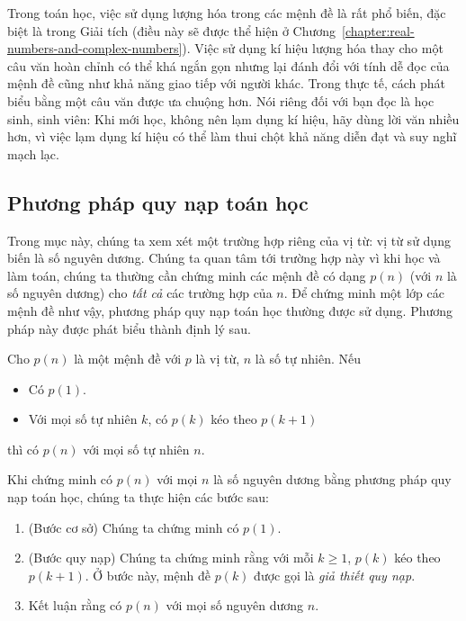 Trong toán học, việc sử dụng lượng hóa trong các mệnh đề là rất phổ biến, đặc biệt là trong Giải tích (điều này sẽ được thể hiện ở Chương~\ref{chapter:real-numbers-and-complex-numbers}). Việc sử dụng kí hiệu lượng hóa thay cho một câu văn hoàn chỉnh có thể khá ngắn gọn nhưng lại đánh đổi với tính dễ đọc của mệnh đề cũng như khả năng giao tiếp với người khác. Trong thực tế, cách phát biểu bằng một câu văn được ưa chuộng hơn. Nói riêng đối với bạn đọc là học sinh, sinh viên: Khi mới học, không nên lạm dụng kí hiệu, hãy dùng lời văn nhiều hơn, vì việc lạm dụng kí hiệu có thể làm thui chột khả năng diễn đạt và suy nghĩ mạch lạc.

\subsection{Phương pháp quy nạp toán học}

Trong mục này, chúng ta xem xét một trường hợp riêng của vị từ: vị từ sử dụng biến là số nguyên dương. Chúng ta quan tâm tới trường hợp này vì khi học và làm toán, chúng ta thường cần chứng minh các mệnh đề có dạng $p(n)$ (với $n$ là số nguyên dương) cho \textit{tất cả} các trường hợp của $n$. Để chứng minh một lớp các mệnh đề như vậy, phương pháp quy nạp toán học thường được sử dụng. Phương pháp này được phát biểu thành định lý sau.

\bigskip

\begin{theorem}
    Cho $p(n)$ là một mệnh đề với $p$ là vị từ, $n$ là số tự nhiên. Nếu
    \begin{itemize}
        \item Có $p(1)$.
        \item Với mọi số tự nhiên $k$, có $p(k)$ kéo theo $p(k + 1)$
    \end{itemize}

    thì có $p(n)$ với mọi số tự nhiên $n$.
\end{theorem}

Khi chứng minh có $p(n)$ với mọi $n$ là số nguyên dương bằng phương pháp quy nạp toán học, chúng ta thực hiện các bước sau:

\begin{enumerate}[label={\textbf{Bước \arabic*.}},itemindent=1cm]
    \item (Bước cơ sở) Chúng ta chứng minh có $p(1)$.
    \item (Bước quy nạp) Chúng ta chứng minh rằng với mỗi $k\geq 1$, $p(k)$ kéo theo $p(k+1)$. Ở bước này, mệnh đề $p(k)$ được gọi là \textit{giả thiết quy nạp}.
    \item Kết luận rằng có $p(n)$ với mọi số nguyên dương $n$.
\end{enumerate}

